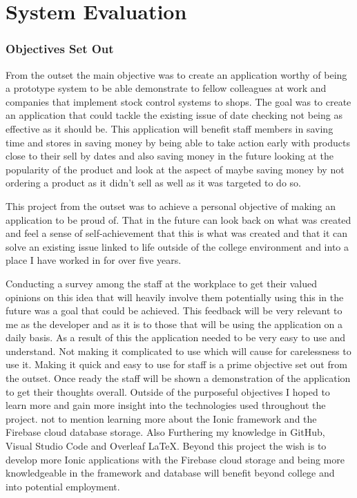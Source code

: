 \chapter{System Evaluation}

\subsection{Objectives Set Out}
From the outset the main objective was to create an application worthy of being a prototype system to be able demonstrate to fellow colleagues at work and companies that implement stock control systems to shops. The goal was to create an application that could tackle the existing issue of date checking not being as effective as it should be. This application will benefit staff members in saving time and stores in saving money by being able to take action early with products close to their sell by dates and also saving money in the future looking at the popularity of the product and look at the aspect of maybe saving money by not ordering a product as it didn't sell as well as it was targeted to do so.
\newline

This project from the outset was to achieve a personal objective of making an application to be proud of. That in the future can look back on what was created and feel a sense of self-achievement that this is what was created and that it can solve an existing issue linked to life outside of the college environment and into a place I have worked in for over five years. 
\newline

Conducting a survey among the staff at the workplace to get their valued opinions on this idea that will heavily involve them potentially using this in the future was a goal that could be achieved. This feedback will be very relevant to me as the developer and as it is to those that will be using the application on a daily basis. As a result of this the application needed to be very easy to use and understand. Not making it complicated to use which will cause for carelessness to use it. Making it quick and easy to use for staff is a prime objective set out from the outset. Once ready the staff will be shown a demonstration of the application to get their thoughts overall.
\newline
\newpage
Outside of the purposeful objectives I hoped to learn more and gain more insight into the technologies used throughout the project. not to mention learning more about the Ionic framework and the Firebase cloud database storage. Also Furthering my knowledge in GitHub, Visual Studio Code and Overleaf LaTeX. Beyond this project the wish is to develop more Ionic applications with the Firebase cloud storage and being more knowledgeable in the framework and database will benefit beyond college and into potential employment.  

